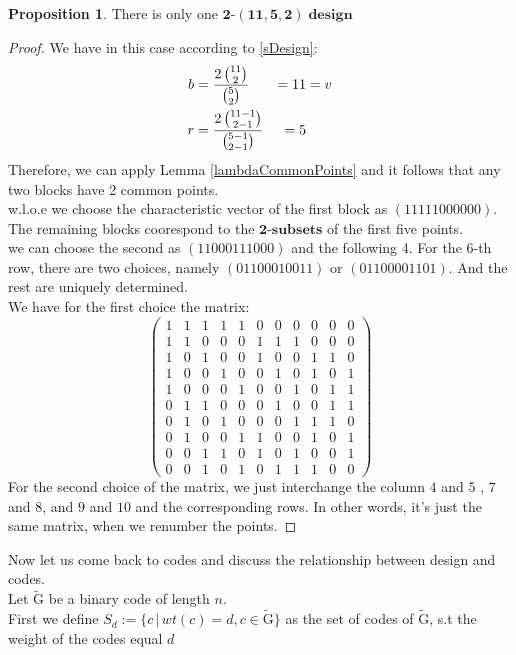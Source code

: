 \documentclass[12pt]{article}
\theoremstyle{definition}
\newtheorem{prop}[theorem]{Proposition}
\numberwithin{equation}{theorem}
\numberwithin{figure}{theorem}
\newcommand{\tParamDesign}[4]{\ensuremath{\bm{#1\mbox{-}(#2,#3,#4)\; design}}}
\newcommand{\cCodes}{\ensuremath{\widetilde{\mathrm{G}}}}
\newcommand{\tSubset}[1]{\ensuremath{\bm{#1\mbox{-}{subset}}}}
\newcommand{\wloe}{w.l.o.e}
\begin{document}
\begin{prop}\label{onlyOneDesign}
There is only one \tParamDesign{2}{11}{5}{2}
\end{prop}
\begin{proof}
We have in this case according to \eqref{sDesign}:
\begin{alignat}{3}
	b &= \frac{2\,\binom{11}{2}}{\binom{5}{2}} & = 11 &= v \notag\\
	r &= \frac{2 \, \binom{11-1}{2 - 1}}{\binom{5-1}{2 - 1}} & = 5 & \notag\phantom{v} 
\end{alignat}
Therefore, we can apply Lemma \ref{lambdaCommonPoints} and it follows that any two blocks have 2 common points.\\
{\wloe} we choose the characteristic vector of the first block as 
$(1 1 1 1 1 0 0 0 0 0 0)$. The remaining blocks coorespond to the {\tSubset{2}}\textbf{s} of the first five points.\\
we can choose the second as $(1 1 0 0 0 1 1 1 0 0 0)$ and the following 4. For the $6$-th row, there are two choices, namely
$(0 1 1 0 0 0 1 0 0 1 1)$ or $(0 1 1 0 0 0 0 1 1 0 1)$. And the rest are uniquely determined. \\
We have for the first choice the matrix:
\[
	\begin{pmatrix}
 1 & 1 & 1 & 1 & 1 & 0 & 0 & 0 & 0 & 0 & 0 \\
 1 & 1 & 0 & 0 & 0 & 1 & 1 & 1 & 0 & 0 & 0 \\
 1 & 0 & 1 & 0 & 0 & 1 & 0 & 0 & 1 & 1 & 0 \\
 1 & 0 & 0 & 1 & 0 & 0 & 1 & 0 & 1 & 0 & 1 \\
 1 & 0 & 0 & 0 & 1 & 0 & 0 & 1 & 0 & 1 & 1 \\
 0 & 1 & 1 & 0 & 0 & 0 & 1 & 0 & 0 & 1 & 1 \\
 0 & 1 & 0 & 1 & 0 & 0 & 0 & 1 & 1 & 1 & 0 \\
 0 & 1 & 0 & 0 & 1 & 1 & 0 & 0 & 1 & 0 & 1 \\
 0 & 0 & 1 & 1 & 0 & 1 & 0 & 1 & 0 & 0 & 1 \\
 0 & 0 & 1 & 0 & 1 & 0 & 1 & 1 & 1 & 0 & 0 
	\end{pmatrix}
\]
For the second choice of the matrix, we just interchange the column $4$ and $5$ , $7$ and $8$, and $9$ and $10$ and the corresponding rows. In other words, it's just the same matrix, when we renumber the points.
\end{proof}
Now let us come back to codes and discuss the relationship between design and codes.\\
Let {\cCodes} be a binary code of length $n$.\\
First we define $S_d := \{c\,|\,wt(c) = d, c \in \cCodes\}$ as the set of codes of \cCodes, s.t the weight of the codes equal $d$
\end{document}

